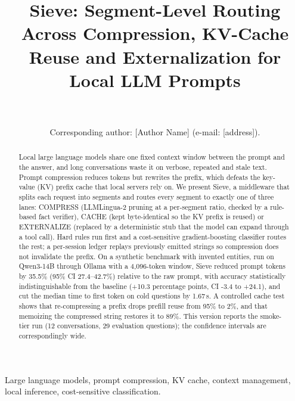 \documentclass[journal]{IEEEtran}
\begin{document}
\title{Sieve: Segment-Level Routing Across Compression, KV-Cache Reuse and Externalization for Local LLM Prompts}
\author{\\
\\
Corresponding author: [Author Name] (e-mail: [address]).}
\maketitle
\pagestyle{accesshead}\thispagestyle{accesshead}

\begin{abstract}
Local large language models share one fixed context window between the prompt and the answer, and long conversations waste it on verbose, repeated and stale text. Prompt compression reduces tokens but rewrites the prefix, which defeats the key-value (KV) prefix cache that local servers rely on. We present Sieve, a middleware that splits each request into segments and routes every segment to exactly one of three lanes: COMPRESS (LLMLingua-2 pruning at a per-segment ratio, checked by a rule-based fact verifier), CACHE (kept byte-identical so the KV prefix is reused) or EXTERNALIZE (replaced by a deterministic stub that the model can expand through a tool call). Hard rules run first and a cost-sensitive gradient-boosting classifier routes the rest; a per-session ledger replays previously emitted strings so compression does not invalidate the prefix. On a synthetic benchmark with invented entities, run on Qwen3-14B through Ollama with a 4,096-token window, Sieve reduced prompt tokens by 35.5\% (95\% CI 27.4--42.7\%) relative to the raw prompt, with accuracy statistically indistinguishable from the baseline (+10.3 percentage points, CI -3.4 to +24.1), and cut the median time to first token on cold questions by 1.67\,s. A controlled cache test shows that re-compressing a prefix drops prefill reuse from 95\% to 2\%, and that memoizing the compressed string restores it to 89\%. This version reports the smoke-tier run (12 conversations, 29 evaluation questions); the confidence intervals are correspondingly wide.
\end{abstract}

\begin{IEEEkeywords}
Large language models, prompt compression, KV cache, context management, local inference, cost-sensitive classification.
\end{IEEEkeywords}
\end{document}
